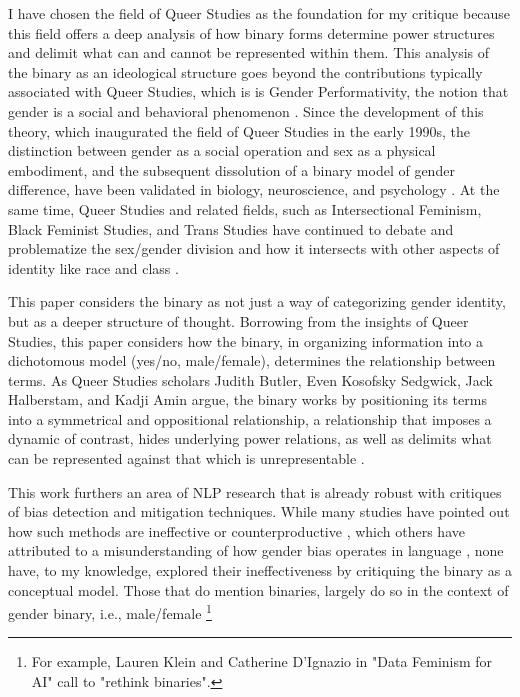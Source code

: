 \documentclass[11pt]{article}
\begin{document}
I have chosen the field of Queer Studies as the foundation for my
critique because this field offers a deep analysis of how binary forms
determine power structures and delimit what can and cannot be
represented within them. This analysis of the binary as an ideological
structure goes beyond the contributions typically associated with
Queer Studies, which is is Gender Performativity, the notion that
gender is a social and behavioral phenomenon \citep{butler:1990}.
Since the development of this theory, which inaugurated the field of
Queer Studies in the early 1990s, the distinction between gender as a
social operation and sex as a physical embodiment, and the subsequent
dissolution of a binary model of gender difference, have been
validated in biology, neuroscience, and
psychology \citep{ainsworth:2015,hyde:2019,joel:2021}. At the same
time, Queer Studies and related fields, such as Intersectional
Feminism, Black Feminist Studies, and Trans Studies have continued to
debate and problematize the sex/gender division and how it intersects
with other aspects of identity like race and
class \citep{amin:2022,hooks:2000,munoz:2009,klein:2024}.

This paper considers the binary as not just a way of categorizing
gender identity, but as a deeper structure of thought. Borrowing from
the insights of Queer Studies, this paper considers how the binary, in
organizing information into a dichotomous model (yes/no, male/female),
determines the relationship between terms. As Queer Studies scholars
Judith Butler, Even Kosofsky Sedgwick, Jack Halberstam, and Kadji Amin
argue, the binary works by positioning its terms into a symmetrical
and oppositional relationship, a relationship that imposes a dynamic
of contrast, hides underlying power relations, as well as delimits
what can be represented against that which is
unrepresentable \citep{butler:1993,sedgwick:1990,halberstam:1998,amin:2022}.

This work furthers an area of NLP research that is already robust with
critiques of bias detection and mitigation techniques. While many
studies have pointed out how such methods are ineffective or
counterproductive \citep{gonen:2019,blodgett:2021}, which others have
attributed to a misunderstanding of how gender bias operates in
language \citep{devinney:2022,hitti:2019,nemani:2023,meade:2022,caliskan:2022},
none have, to my knowledge, explored their ineffectiveness by
critiquing the binary as a conceptual model. Those that do mention
binaries, largely do so in the context of gender binary, i.e.,
male/female \citep{hitti:2019,nemani:2023,klein:2024-1} \footnote{For example, Lauren Klein and Catherine D'Ignazio in "Data Feminism for AI" call to "rethink binaries".}
\end{document}
